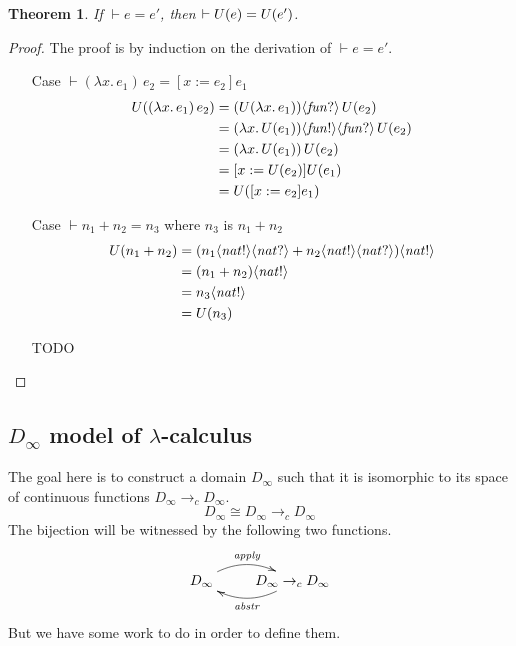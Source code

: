 \documentclass{tufte-handout}
\newcommand{\LAM}[1]{\lambda #1.\,}
\newcommand{\APP}[0]{\,}
\newtheorem{theorem}{Theorem}%
\begin{document}
\begin{theorem}
If $\vdash e = e'$, then $\vdash U(e) = U(e')$.
\end{theorem}
\begin{proof}
The proof is by induction on the derivation of $\vdash e = e'$.
\begin{itemize}
\item[Case] $\vdash (\LAM{x}e_1)\APP e_2 = [ x := e_2 ]e_1$
  \begin{align*}
    \uni{(\LAM{x}e_1)\APP e_2}
        &= \coerce{(\uni{\LAM{x}e_1})}{\mathit{fun}?} \APP \uni{e_2}\\
        &= \coerce{\coerce{(\LAM{x}\uni{e_1})}{\mathit{fun}!}}{\mathit{fun}?} \APP \uni{e_2}\\
        &= (\LAM{x}\uni{e_1}) \APP \uni{e_2}\\
        &= [x:=\uni{e_2}]\uni{e_1} \\
        &= \uni{[x:=e_2]e_1} 
  \end{align*}
\item[Case $\vdash n_1 + n_2 = n_3$ where $n_3$ is $n_1 + n_2$]
\begin{align*}
  U(n_1+n_2) &= 
     (n_1\langle \mathit{nat}!\rangle\langle \mathit{nat}?\rangle +
              n_2\langle \mathit{nat}!\rangle\langle \mathit{nat}?\rangle)\langle \mathit{nat}!\rangle \\
  &= (n_1 + n_2)\langle \mathit{nat}!\rangle \\
  &= n_3\langle \mathit{nat}!\rangle \\
  &= U(n_3) 
\end{align*}
\item[TODO]
\end{itemize}
\end{proof}

\subsection{$D_\infty$ model of $\lambda$-calculus}
\label{sec:D-infinity}

The goal here is to construct a domain $D_\infty$ such that it is
isomorphic to its space of continuous functions $D_\infty \to_c D_\infty$.
\[
  D_\infty \cong D_{\infty} \to_c D_{\infty}
\]
The bijection will be witnessed by the following two functions.
\[
\xymatrix{
  D_\infty \ar@/^1pc/[r]^{\mathit{apply}}  &
  D_{\infty} \to_c D_{\infty} \ar@/^1pc/[l]^{\mathit{abstr}}
}
\]
But we have some work to do in order to define them.
\end{document}
